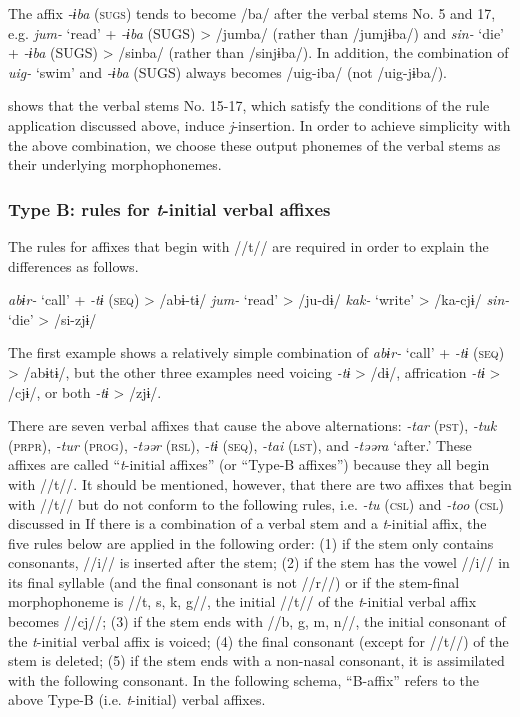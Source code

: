 The affix \textit{-ɨba} (\textsc{sugs}) tends to become /ba/ after the verbal stems No. 5 and 17, e.g. \textit{jum-} ‘read’ + \textit{-ɨba} (SUGS) > /jumba/ (rather than /jumjɨba/) and \textit{sin-} ‘die’ + \textit{-ɨba} (SUGS) > /sinba/ (rather than /sinjɨba/). In addition, the combination of \textit{uig-} ‘swim’ and \textit{-ɨba} (SUGS) always becomes /uig-iba/ (not /uig-jɨba/).

 shows that the verbal stems No. 15-17, which satisfy the conditions of the rule application discussed above, induce \textit{j}-insertion. In order to achieve simplicity with the above combination, we choose these output phonemes of the verbal stems as their underlying morphophonemes.

\subsubsection{Type B: rules for \textit{t}-initial verbal affixes}
\label{bkm:Ref347175824}
The rules for affixes that begin with //t// are required in order to explain the differences as follows.

\ea\label{ex:8-12}
    \ea \textit{abɨr-}  ‘call’  +  \textit{-tɨ} (\textsc{seq})  >  /abɨ-tɨ/
    \ex \textit{jum-}  ‘read’        >  /ju-dɨ/
    \ex \textit{kak-}  ‘write’        >  /ka-cjɨ/
    \ex \textit{sin-}  ‘die’        >  /si-zjɨ/
    \z
\z

The first example shows a relatively simple combination of \textit{abɨr-} ‘call’ + \textit{-tɨ} (\textsc{seq}) > /abɨtɨ/, but the other three examples need voicing \textit{-tɨ} > /dɨ/, affrication \textit{-tɨ} > /cjɨ/, or both \textit{-tɨ} > /zjɨ/.

There are seven verbal affixes that cause the above alternations: \textit{-tar} (\textsc{pst}), \textit{-tuk} (\textsc{prpr}), \textit{-tur} (\textsc{prog}), \textit{-təər} (\textsc{rsl}), \textit{-tɨ} (\textsc{seq}), \textit{-tai} (\textsc{lst}), and \textit{-təəra} ‘after.’ These affixes are called “\textit{t}-initial affixes” (or “Type-B affixes”) because they all begin with //t//. It should be mentioned, however, that there are two affixes that begin with //t// but do not conform to the following rules, i.e. \textit{-tu} (\textsc{csl}) and \textit{-too} (\textsc{csl}) discussed in  If there is a combination of a verbal stem and a \textit{t}-initial affix, the five rules below are applied in the following order: (1) if the stem only contains consonants, //i// is inserted after the stem; (2) if the stem has the vowel //i// in its final syllable (and the final consonant is not //r//) or if the stem-final morphophoneme is //t, s, k, g//, the initial //t// of the \textit{t}-initial verbal affix becomes //cj//; (3) if the stem ends with //b, g, m, n//, the initial consonant of the \textit{t}-initial verbal affix is voiced; (4) the final consonant (except for //t//) of the stem is deleted; (5) if the stem ends with a non-nasal consonant, it is assimilated with the following consonant. In the following schema, “B-affix” refers to the above Type-B (i.e. \textit{t}-initial) verbal affixes.


